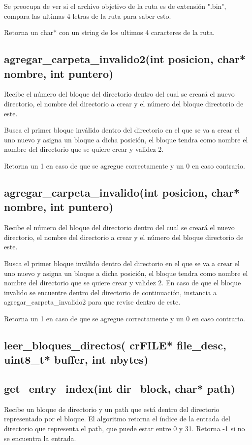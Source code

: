 \documentclass[12pt]{article}
\begin{document}
Se preocupa de ver si el archivo objetivo de la ruta es de extensión ".bin", compara las ultimas 4 letras de la ruta para saber esto.

Retorna un char* con un string de los ultimos 4 caracteres de la ruta.

\subsection{agregar\_carpeta\_invalido2(int posicion, char* nombre, int puntero)}
Recibe el número del bloque del directorio dentro del cual se creará el nuevo directorio, el nombre del directorio a crear y el número del bloque directorio de este.

Busca el primer bloque inválido dentro del directorio en el que se va a crear el uno nuevo y asigna un bloque a dicha posición, el bloque tendra como nombre el nombre del directorio que se quiere crear y validez 2.

Retorna un 1 en caso de que se agregue correctamente y un 0 en caso contrario.


\subsection{agregar\_carpeta\_invalido(int posicion, char* nombre, int puntero)}
Recibe el número del bloque del directorio dentro del cual se creará el nuevo directorio, el nombre del directorio a crear y el número del bloque directorio de este.

Busca el primer bloque inválido dentro del directorio en el que se va a crear el uno nuevo y asigna un bloque a dicha posición, el bloque tendra como nombre el nombre del directorio que se quiere crear y validez 2. En caso de que el bloque invalido se encuentre dentro del directorio de continuación, instancia a agregar\_carpeta\_invalido2 para que revise dentro de este.

Retorna un 1 en caso de que se agregue correctamente y un 0 en caso contrario.

\subsection{leer\_bloques\_directos( crFILE* file\_desc, uint8\_t* buffer, int nbytes)}

\subsection{get\_entry\_index(int dir\_block, char* path)}
Recibe un bloque de directorio y un path que está dentro del directorio representado por el bloque. El algoritmo retorna el índice de la entrada del directorio que representa el path, que puede estar entre 0 y 31. Retorna -1 si no se encuentra la entrada.
\end{document}

